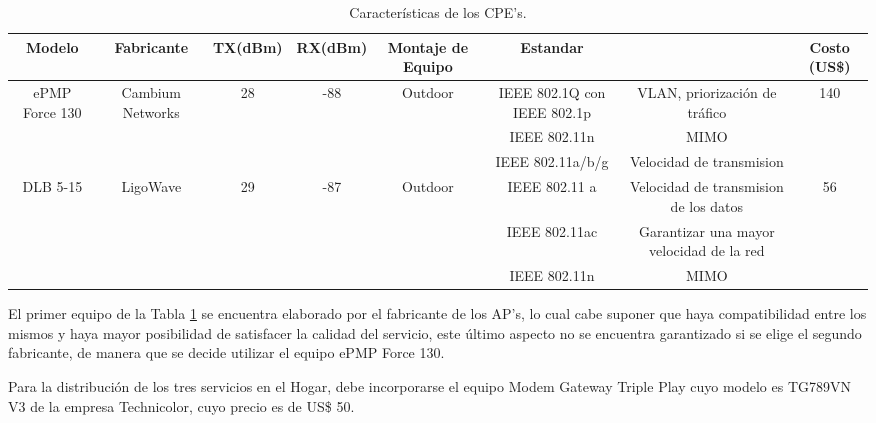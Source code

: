 \begin{table}[H]
  \tiny
  \centering
    \begin{tabular}{|c|c|c|c|c|c|c|c|}
    \hline
    \rowcolor[rgb]{ .773,  .851,  .945} \textbf{Modelo} & \textbf{Fabricante} & \textbf{TX(dBm)} & \textbf{RX(dBm)} & \textbf{Montaje de Equipo} & \textbf{Estandar} &       & \textbf{Costo (US\$)} \bigstrut\\
    \hline
    \multirow{3}[6]{*}{ePMP Force 130} & \multirow{3}[6]{*}{Cambium Networks} & \multirow{3}[6]{*}{28} & \multirow{3}[6]{*}{-88} & \multirow{3}[6]{*}{Outdoor} & IEEE 802.1Q con IEEE 802.1p & VLAN, priorización de tráfico  & \multirow{3}[6]{*}{140 \cite{CPE}} \bigstrut\\
\cline{6-7}          &       &       &       &       & IEEE 802.11n & MIMO  &  \bigstrut\\
\cline{6-7}          &       &       &       &       & IEEE 802.11a/b/g & Velocidad de transmision  &  \bigstrut\\
    \hline
    \multirow{3}[6]{*}{ DLB 5-15} & \multirow{3}[6]{*}{LigoWave} & \multirow{3}[6]{*}{29} & \multirow{3}[6]{*}{-87} & \multirow{3}[6]{*}{Outdoor} & IEEE 802.11 a & Velocidad de transmision de los datos  & \multirow{3}[6]{*}{56} \bigstrut\\
\cline{6-7}          &       &       &       &       & IEEE 802.11ac & \textcolor[rgb]{ .125,  .129,  .141}{Garantizar una mayor velocidad de la red} &  \bigstrut\\
\cline{6-7}          &       &       &       &       & IEEE 802.11n & MIMO  &  \bigstrut\\
    \hline
    \end{tabular}%
	\caption{Características de los CPE's.}
  \label{tab:caracteristicas-cpe}%
\end{table}%


El primer equipo de la Tabla \ref{tab:caracteristicas-cpe} se encuentra elaborado por el fabricante de los AP's, lo cual cabe suponer que haya compatibilidad entre los mismos y haya mayor posibilidad de satisfacer la calidad del servicio, este último aspecto no se encuentra garantizado si se elige el segundo fabricante, de manera que se decide utilizar el equipo ePMP Force 130.

Para la distribución de los tres servicios en el Hogar, debe incorporarse el equipo Modem Gateway Triple Play cuyo modelo es TG789VN V3 de la empresa Technicolor, cuyo precio es de US\$ 50.




